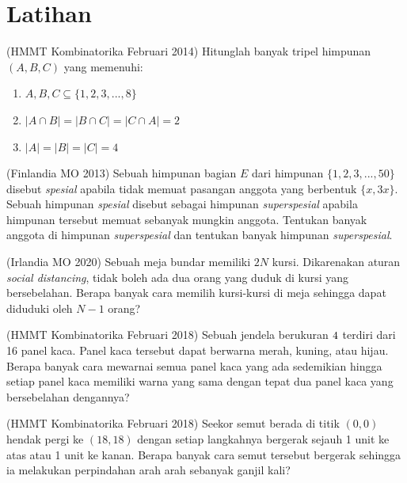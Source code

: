 \documentclass[11pt]{scrartcl}
\begin{document}
\section{Latihan}
\begin{problem}
    (HMMT Kombinatorika Februari 2014) Hitunglah banyak tripel himpunan $(A, B, C)$ yang memenuhi:
    \begin{enumerate}
        \item $A, B, C \subseteq \{1, 2, 3, ..., 8\}$ 
        \item $|A \cap B| = |B \cap C| = |C \cap A| = 2$
        \item $|A| = |B| = |C| = 4$
    \end{enumerate}
\end{problem}

\begin{problem}
    (Finlandia MO 2013) Sebuah himpunan bagian $E$ dari himpunan $\{1, 2, 3, ..., 50\}$ disebut \textit{spesial} apabila tidak memuat pasangan anggota yang berbentuk $\{x, 3x\}$. Sebuah himpunan \textit{spesial} disebut sebagai himpunan \textit{superspesial} apabila himpunan tersebut memuat sebanyak mungkin anggota. Tentukan banyak anggota di himpunan \textit{superspesial} dan tentukan banyak himpunan \textit{superspesial}.
\end{problem}

\begin{problem}
    (Irlandia MO 2020) Sebuah meja bundar memiliki $2N$ kursi. Dikarenakan aturan \textit{social distancing}, tidak boleh ada dua orang yang duduk di kursi yang bersebelahan. Berapa banyak cara memilih kursi-kursi di meja sehingga dapat diduduki oleh $N - 1$ orang?
\end{problem}

\begin{problem}
    (HMMT Kombinatorika Februari 2018) Sebuah jendela berukuran $4 \time 4$ terdiri dari 16 panel kaca. Panel kaca tersebut dapat berwarna merah, kuning, atau hijau. Berapa banyak cara mewarnai semua panel kaca yang ada sedemikian hingga setiap panel kaca memiliki warna yang sama dengan tepat dua panel kaca yang bersebelahan dengannya?
\end{problem}

\begin{problem}
    (HMMT Kombinatorika Februari 2018) Seekor semut berada di titik $(0,0)$ hendak pergi ke $(18, 18)$ dengan setiap langkahnya bergerak sejauh 1 unit ke atas atau 1 unit ke kanan. Berapa banyak cara semut tersebut bergerak sehingga ia melakukan perpindahan arah arah sebanyak ganjil kali?
\end{problem}
\end{document}
